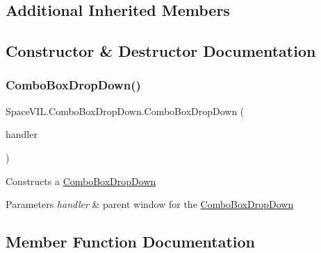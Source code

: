 \subsection*{Additional Inherited Members}


\subsection{Constructor \& Destructor Documentation}
\mbox{\label{class_space_v_i_l_1_1_combo_box_drop_down_a898ab2962be22a43b6d9910549b95a41}} 
\subsubsection{\texorpdfstring{Combo\+Box\+Drop\+Down()}{ComboBoxDropDown()}}
{\footnotesize\ttfamily Space\+V\+I\+L.\+Combo\+Box\+Drop\+Down.\+Combo\+Box\+Drop\+Down (\begin{DoxyParamCaption}\item[{\mbox{\hyperlink{class_space_v_i_l_1_1_window_layout}{Window\+Layout}}}]{handler }\end{DoxyParamCaption})\hspace{0.3cm}{\ttfamily [inline]}}



Constructs a \mbox{\hyperlink{class_space_v_i_l_1_1_combo_box_drop_down}{Combo\+Box\+Drop\+Down}} 


\begin{DoxyParams}{Parameters}
{\em handler} & parent window for the \mbox{\hyperlink{class_space_v_i_l_1_1_combo_box_drop_down}{Combo\+Box\+Drop\+Down}} \\
\hline
\end{DoxyParams}


\subsection{Member Function Documentation}
\mbox{\label{class_space_v_i_l_1_1_combo_box_drop_down_aaaaf954c53c9e0adba384e25b66150a1}} 
